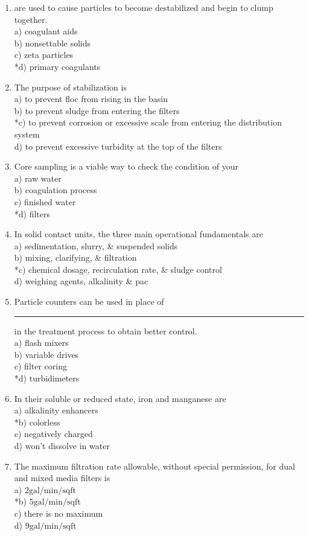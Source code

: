 \begin{enumerate}
  \item are used to cause particles to become destabilized and begin to clump together.\\
a) coagulant aids\\
b) nonsettable solids\\
c) zeta particles\\
*d) primary coagulants\\
 \item The purpose of stabilization is\\
a) to prevent floc from rising in the basin\\
b) to prevent sludge from entering the filters\\
*c) to prevent corrosion or excessive scale from entering the distribution system\\
d) to prevent excessive turbidity at the top of the filters\\
  \item Core sampling is a viable way to check the condition of your\\
a) raw water\\
b) coagulation process\\
c) finished water\\
*d) filters\\
 \item In solid contact units, the three main operational fundamentals are\\
a) sedimentation, slurry, \& suspended solids\\
b) mixing, clarifying, \& filtration\\
*c) chemical dosage, recirculation rate, \& sludge control\\
d) weighing agents, alkalinity \& pac\\
  \item Particle counters can be used in place of \rule{1.5cm}{0.5pt} in the treatment process to obtain better control.\\
a) flash mixers\\
b) variable drives\\
c) filter coring\\
*d) turbidimeters\\
  \item In their soluble or reduced state, iron and manganese are\\
a) alkalinity enhancers\\
*b) colorless\\
c) negatively charged\\
d) won't dissolve in water\\
  \item The maximum filtration rate allowable, without special permission, for dual and mixed media filters is\\
a) $2 \mathrm{gal} / \mathrm{min} / \mathrm{sq} \mathrm{ft}$\\
*b) $5 \mathrm{gal} / \mathrm{min} / \mathrm{sq} \mathrm{ft}$\\
c) there is no maximum\\
d) $9 \mathrm{gal} / \mathrm{min} / \mathrm{sq} \mathrm{ft}$\\


\end{enumerate}
